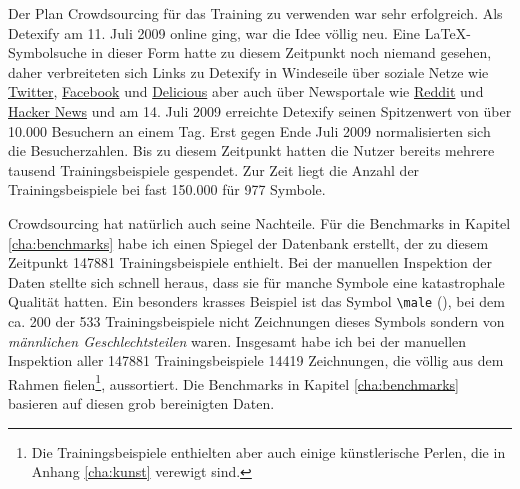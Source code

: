 Der Plan Crowdsourcing für das Training zu verwenden war sehr erfolgreich. Als Detexify am 11. Juli 2009 online ging, war die Idee völlig neu. Eine \LaTeX-Symbolsuche in dieser Form hatte zu diesem Zeitpunkt noch niemand gesehen, daher verbreiteten sich Links zu Detexify in Windeseile über soziale Netze wie \href{http://twitter.com}{Twitter}, \href{http://facebook.com}{Facebook} und \href{http://delicious.com}{Delicious} aber auch über Newsportale wie \href{http://reddit.com}{Reddit} und \href{http://news.ycombinator.com}{Hacker News} und am 14. Juli 2009 erreichte Detexify seinen Spitzenwert von über 10.000 Besuchern an einem Tag. Erst gegen Ende Juli 2009 normalisierten sich die Besucherzahlen. Bis zu diesem Zeitpunkt hatten die Nutzer bereits mehrere tausend Trainingsbeispiele gespendet. Zur Zeit liegt die Anzahl der Trainingsbeispiele bei fast 150.000 für 977 Symbole.

Crowdsourcing hat natürlich auch seine Nachteile. Für die Benchmarks in Kapitel \ref{cha:benchmarks} habe ich einen Spiegel der Datenbank erstellt, der zu diesem Zeitpunkt 147881 Trainingsbeispiele enthielt. Bei der manuellen Inspektion der Daten stellte sich schnell heraus, dass sie für manche Symbole eine katastrophale Qualität hatten. Ein besonders krasses Beispiel ist das Symbol \verb!\male! (\Male), %
bei dem ca. 200 der 533 Trainingsbeispiele nicht Zeichnungen dieses Symbols sondern von \emph{männlichen Geschlechtsteilen} waren. Insgesamt habe ich bei der manuellen Inspektion aller 147881 Trainingsbeispiele 14419 Zeichnungen, die völlig aus dem Rahmen fielen\footnote{Die Trainingsbeispiele enthielten aber auch einige künstlerische Perlen, die in Anhang \ref{cha:kunst} verewigt sind.}, aussortiert. Die Benchmarks in Kapitel \ref{cha:benchmarks} basieren auf diesen grob bereinigten Daten.


